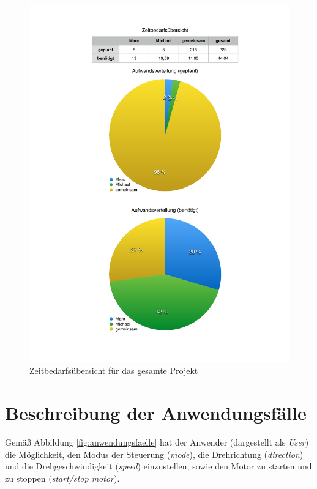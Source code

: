 \documentclass[ngerman,fontsize=12pt , paper=a4 , twoside=false , DIV12 , BCOR=1cm ,
numbers=enddot , listof=totoc , bibliography=totoc , index=totoc ,
headings=small , headlines=1.5 , final]{scrbook}
\begin{document}
\begin{figure}[htbp]
\centering
\includegraphics{../../Planning/Zeitbedarf.pdf}
\caption{Zeitbedarfsübersicht für das gesamte
Projekt\label{fig:zeitbedarf}}
\end{figure}

\newpage

\chapter{Beschreibung der
Anwendungsfälle}\label{beschreibung-der-anwendungsfuxe4lle}

Gemäß Abbildung \ref{fig:anwendungsfaelle} hat der Anwender (dargestellt
als \emph{User}) die Möglichkeit, den Modus der Steuerung (\emph{mode}),
die Drehrichtung (\emph{direction}) und die Drehgeschwindigkeit
(\emph{speed}) einzustellen, sowie den Motor zu starten und zu stoppen
(\emph{start/stop motor}).
\end{document}
